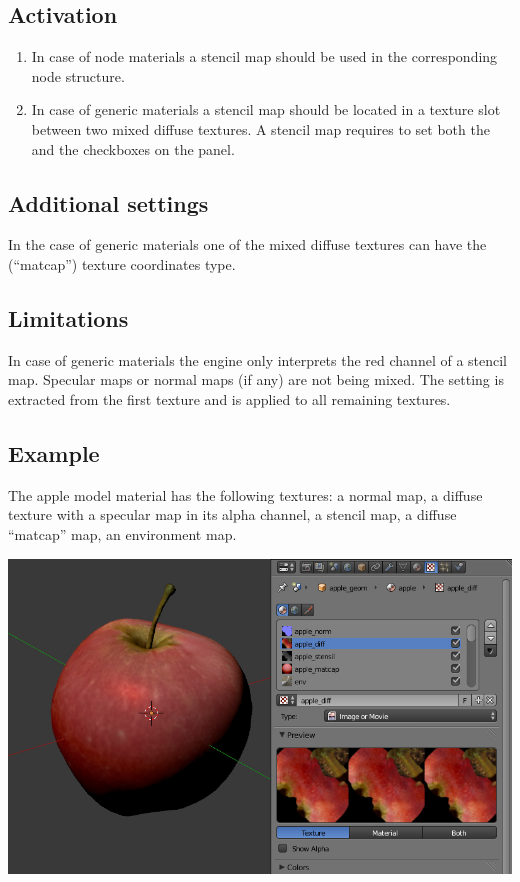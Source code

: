 \documentclass[a4paper,12pt,oneside]{sphinxmanual}
\begin{document}
\subsection{Activation}
\label{textures:id14}\begin{enumerate}
\item {} 
In case of node materials a stencil map should be used in the corresponding node structure.

\item {} 
In case of generic materials a stencil map should be located in a texture slot between two mixed diffuse textures. A stencil map requires to set both the  and the  checkboxes on the  panel.

\end{enumerate}


\subsection{Additional settings}
\label{textures:id15}
In the case of generic materials one of the mixed diffuse textures can have the  (``matcap'') texture coordinates type.


\subsection{Limitations}
\label{textures:id16}
In case of generic materials the engine only interprets the red channel of a stencil map. Specular maps or normal maps (if any) are not being mixed. The  setting is extracted from the first texture and is applied to all remaining textures.


\subsection{Example}
\label{textures:id17}
The apple model material has the following textures: a normal map, a diffuse texture with a specular map in its alpha channel, a stencil map, a diffuse ``matcap'' map, an environment map.

{\hfill\includegraphics[width=1.000\linewidth]{stencil_apple.jpg}\hfill}
\end{document}
